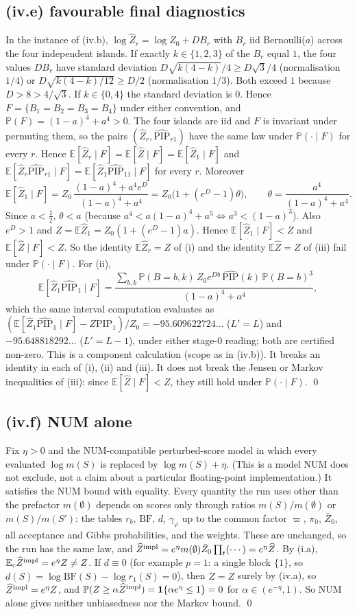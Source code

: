 \documentclass[11pt]{article}
\theoremstyle{remark}
\newcommand{\E}{\mathbb{E}}
\renewcommand{\P}{\mathbb{P}}
\newcommand{\Zh}{\widehat Z}
\newcommand{\PIPh}{\widehat{\mathrm{PIP}}}
\newcommand{\PIP}{\mathrm{PIP}}
\newcommand{\Zb}{\bar Z}
\newcommand{\ind}{\mathbf 1}
\begin{document}
\subsection{(iv.e) favourable final diagnostics}
In the instance of (iv.b), $\log\Zh_r=\log Z_0+DB_r$ with $B_r$ iid Bernoulli($a$) across the four independent islands. If exactly $k\in\{1,2,3\}$ of the $B_r$ equal $1$, the four values $DB_r$ have standard deviation $D\sqrt{k(4-k)}/4\ge D\sqrt3/4$ (normalisation $1/4$) or $D\sqrt{k(4-k)/12}\ge D/2$ (normalisation $1/3$). Both exceed $1$ because $D>8>4/\sqrt3$. If $k\in\{0,4\}$ the standard deviation is $0$. Hence $F=\{B_1=B_2=B_3=B_4\}$ under either convention, and $\P(F)=(1-a)^4+a^4>0$. The four islands are iid and $F$ is invariant under permuting them, so the pairs $(\Zh_r,\PIPh_{r1})$ have the same law under $\P(\cdot\mid F)$ for every $r$. Hence $\E[\Zh_r\mid F]=\E[\Zh\mid F]=\E[\Zh_1\mid F]$ and $\E[\Zh_r\PIPh_{r1}\mid F]=\E[\Zh_1\PIPh_{11}\mid F]$ for every $r$. Moreover
\[ \E[\Zh_1\mid F]=Z_0\,\frac{(1-a)^4+a^4e^D}{(1-a)^4+a^4}=Z_0\big(1+(e^D-1)\theta\big),\qquad \theta=\frac{a^4}{(1-a)^4+a^4}. \]
Since $a<\frac12$, $\theta<a$ (because $a^4<a(1-a)^4+a^5\iff a^3<(1-a)^3$). Also $e^D>1$ and $Z=\E\Zh_1=Z_0(1+(e^D-1)a)$. Hence $\E[\Zh_1\mid F]<Z$ and $\E[\Zh\mid F]<Z$. So the identity $\E\Zh_r=Z$ of (i) and the identity $\E\Zh=Z$ of (iii) fail under $\P(\cdot\mid F)$. For (ii),
\[ \E[\Zh_1\PIPh_1\mid F]=\frac{\sum_{b,k}\P(B=b,k)\,Z_0e^{Db}\,\PIPh(k)\,\P(B=b)^3}{(1-a)^4+a^4}, \]
which the same interval computation evaluates as $(\E[\Zh_1\PIPh_1\mid F]-Z\PIP_1)/Z_0=-95.609622724\ldots$ ($L'=L$) and $-95.648818292\ldots$ ($L'=L-1$), under either stage-0 reading; both are certified non-zero. This is a component calculation (scope as in (iv.b)). It breaks an identity in each of (i), (ii) and (iii). It does not break the Jensen or Markov inequalities of (iii): since $\E[\Zh\mid F]<Z$, they still hold under $\P(\cdot\mid F)$. \qed

\subsection{(iv.f) NUM alone}
Fix $\eta>0$ and the NUM-compatible perturbed-score model in which every evaluated $\log m(S)$ is replaced by $\log m(S)+\eta$. (This is a model NUM does not exclude, not a claim about a particular floating-point implementation.) It satisfies the NUM bound with equality. Every quantity the run uses other than the prefactor $m(\emptyset)$ depends on scores only through ratios $m(S)/m(\emptyset)$ or $m(S)/m(S')$: the tables $r_b$, $\mathrm{BF}$, $d$, $\gamma_\varphi$ up to the common factor $\varpi$, $\pi_0$, $\Zb_0$, all acceptance and Gibbs probabilities, and the weights. These are unchanged, so the run has the same law, and $\Zh^{\rm impl}=e^\eta m(\emptyset)\Zb_0\prod_t(\cdots)=e^\eta\Zh$. By (i.a), $\E_c\Zh^{\rm impl}=e^\eta Z\neq Z$. If $d\equiv0$ (for example $p=1$: a single block $\{1\}$, so $d(S)=\log\mathrm{BF}(S)-\log r_1(S)=0$), then $\Zh=Z$ surely by (iv.a), so $\Zh^{\rm impl}=e^\eta Z$, and $\P(Z\ge\alpha\Zh^{\rm impl})=\ind\{\alpha e^\eta\le1\}=0$ for $\alpha\in(e^{-\eta},1)$. So NUM alone gives neither unbiasedness nor the Markov bound. \qed
\end{document}
